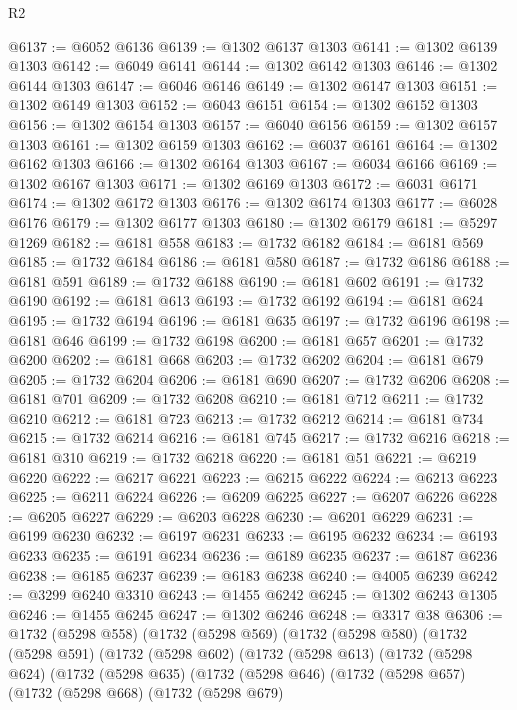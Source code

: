 \begin{lexlean}{R2}
\begin{coremodule}
@6137 := @6052 @6136
@6139 := @1302 @6137 @1303
@6141 := @1302 @6139 @1303
@6142 := @6049 @6141
@6144 := @1302 @6142 @1303
@6146 := @1302 @6144 @1303
@6147 := @6046 @6146
@6149 := @1302 @6147 @1303
@6151 := @1302 @6149 @1303
@6152 := @6043 @6151
@6154 := @1302 @6152 @1303
@6156 := @1302 @6154 @1303
@6157 := @6040 @6156
@6159 := @1302 @6157 @1303
@6161 := @1302 @6159 @1303
@6162 := @6037 @6161
@6164 := @1302 @6162 @1303
@6166 := @1302 @6164 @1303
@6167 := @6034 @6166
@6169 := @1302 @6167 @1303
@6171 := @1302 @6169 @1303
@6172 := @6031 @6171
@6174 := @1302 @6172 @1303
@6176 := @1302 @6174 @1303
@6177 := @6028 @6176
@6179 := @1302 @6177 @1303
@6180 := @1302 @6179
@6181 := @5297 @1269
@6182 := @6181 @558
@6183 := @1732 @6182
@6184 := @6181 @569
@6185 := @1732 @6184
@6186 := @6181 @580
@6187 := @1732 @6186
@6188 := @6181 @591
@6189 := @1732 @6188
@6190 := @6181 @602
@6191 := @1732 @6190
@6192 := @6181 @613
@6193 := @1732 @6192
@6194 := @6181 @624
@6195 := @1732 @6194
@6196 := @6181 @635
@6197 := @1732 @6196
@6198 := @6181 @646
@6199 := @1732 @6198
@6200 := @6181 @657
@6201 := @1732 @6200
@6202 := @6181 @668
@6203 := @1732 @6202
@6204 := @6181 @679
@6205 := @1732 @6204
@6206 := @6181 @690
@6207 := @1732 @6206
@6208 := @6181 @701
@6209 := @1732 @6208
@6210 := @6181 @712
@6211 := @1732 @6210
@6212 := @6181 @723
@6213 := @1732 @6212
@6214 := @6181 @734
@6215 := @1732 @6214
@6216 := @6181 @745
@6217 := @1732 @6216
@6218 := @6181 @310
@6219 := @1732 @6218
@6220 := @6181 @51
@6221 := @6219 @6220
@6222 := @6217 @6221
@6223 := @6215 @6222
@6224 := @6213 @6223
@6225 := @6211 @6224
@6226 := @6209 @6225
@6227 := @6207 @6226
@6228 := @6205 @6227
@6229 := @6203 @6228
@6230 := @6201 @6229
@6231 := @6199 @6230
@6232 := @6197 @6231
@6233 := @6195 @6232
@6234 := @6193 @6233
@6235 := @6191 @6234
@6236 := @6189 @6235
@6237 := @6187 @6236
@6238 := @6185 @6237
@6239 := @6183 @6238
@6240 := @4005 @6239
@6242 := @3299 @6240 @3310
@6243 := @1455 @6242
@6245 := @1302 @6243 @1305
@6246 := @1455 @6245
@6247 := @1302 @6246
@6248 := @3317 @38
@6306 := @1732
    (@5298 @558)
    (@1732
      (@5298 @569)
      (@1732
        (@5298 @580)
        (@1732
          (@5298 @591)
          (@1732
            (@5298 @602)
            (@1732
              (@5298 @613)
              (@1732
                (@5298 @624)
                (@1732
                  (@5298 @635)
                  (@1732
                    (@5298 @646)
                    (@1732
                      (@5298 @657)
                      (@1732
                        (@5298 @668)
                        (@1732
                          (@5298 @679)

\end{coremodule}
\end{lexlean}
